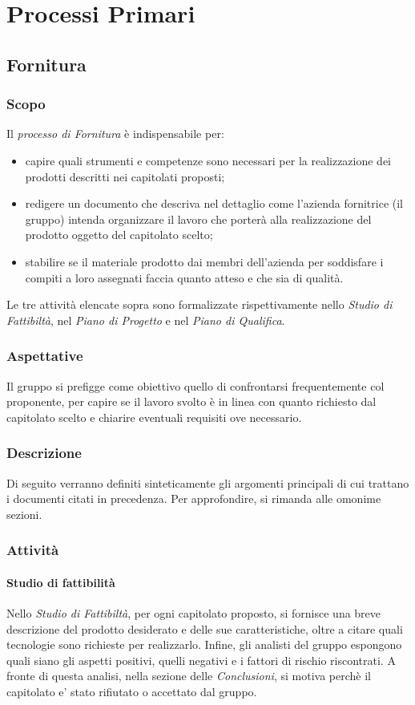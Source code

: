 \section{Processi Primari} 


\subsection{Fornitura}

	\subsubsection{Scopo}
	\text Il \textit{processo di Fornitura} è indispensabile per:
	\begin{itemize}
	\item capire quali strumenti e competenze sono necessari per la realizzazione dei prodotti descritti nei capitolati proposti;
	\item redigere un documento che descriva nel dettaglio come l'azienda fornitrice (il gruppo) intenda organizzare il lavoro che porterà alla realizzazione del prodotto oggetto del capitolato scelto;
	\item stabilire se il materiale prodotto dai membri dell'azienda per soddisfare i compiti a loro assegnati faccia quanto atteso e che sia di qualità.    
	\end{itemize}
Le tre attività elencate sopra sono formalizzate rispettivamente nello \textit{Studio di Fattibiltà}, nel \textit{Piano di Progetto} e nel \textit{Piano di Qualifica}.
 	\subsubsection{Aspettative}
Il gruppo si prefigge come obiettivo quello di confrontarsi frequentemente col proponente, per capire se il lavoro svolto è in linea con quanto richiesto dal capitolato scelto e chiarire eventuali requisiti ove necessario.
	\subsubsection{Descrizione}
	Di seguito verranno definiti sinteticamente gli argomenti principali di cui trattano i documenti citati in precedenza. Per approfondire, si rimanda alle omonime sezioni. 
	\subsubsection{Attività}

		\paragraph{Studio di fattibilità}
			Nello \textit{Studio di Fattibiltà}, per ogni capitolato proposto, si fornisce una breve descrizione del prodotto desiderato e delle sue caratteristiche, oltre a citare quali tecnologie sono richieste per realizzarlo. Infine, gli analisti del gruppo espongono quali siano gli aspetti positivi, quelli negativi e i fattori di rischio riscontrati. A fronte di questa analisi, nella sezione delle \textit{Conclusioni}, si motiva perchè il capitolato e' stato rifiutato o accettato dal gruppo.  
